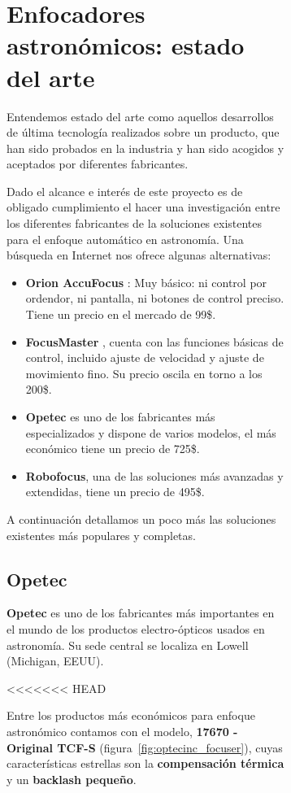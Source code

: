 \begin{itemize}
\begin{itemize}
\begin{figure}[h]
\begin{figure}[h]
\section{Enfocadores astronómicos: estado del arte}

Entendemos estado del arte como aquellos desarrollos de última tecnología realizados sobre un producto, que han sido probados en la industria y han sido acogidos y aceptados por diferentes fabricantes.

Dado el alcance e interés de este proyecto es de obligado cumplimiento el hacer una investigación entre los diferentes fabricantes de la soluciones existentes para el enfoque automático en astronomía. Una búsqueda en Internet nos ofrece algunas alternativas:

\begin{itemize}
	\item \textbf{Orion AccuFocus} \cite{orion_focuser}: Muy básico: ni control por ordendor, ni pantalla, ni botones de control preciso. Tiene un precio en el mercado de 99\$. 
	\item \textbf{FocusMaster} \cite{focusmate}, cuenta con las funciones básicas de control, incluido ajuste de velocidad y ajuste de movimiento fino. Su precio oscila en torno a los 200\$.  
	\item \textbf{Opetec} es uno de los fabricantes más especializados y dispone de varios modelos, el más económico tiene un precio de 725\$.
	\item \textbf{Robofocus}, una de las soluciones más avanzadas y extendidas, tiene un precio de 495\$.
\end{itemize}

A continuación detallamos un poco más las soluciones existentes más populares y completas.

\subsection{Opetec}

\textbf{Opetec} es uno de los fabricantes más importantes en el mundo de los productos electro-ópticos usados en astronomía. Su sede central se localiza en Lowell (Michigan, EEUU).

<<<<<<< HEAD

Entre los productos más económicos para enfoque astronómico contamos con el modelo, \textbf{17670 - Original TCF-S} (figura~\ref{fig:optecinc_focuser}), cuyas características estrellas son la \textbf{compensación térmica} y un \textbf{backlash pequeño}.



\end{figure}
\end{figure}
\end{itemize}
\end{itemize}
